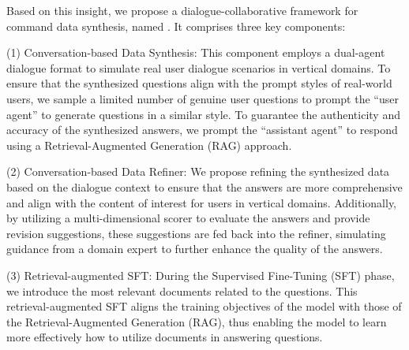 

Based on this insight, we propose a dialogue-collaborative framework for command data synthesis, named \ourmodel. It comprises three key components:

(1) Conversation-based Data Synthesis: This component employs a dual-agent dialogue format to simulate real user dialogue scenarios in vertical domains. To ensure that the synthesized questions align with the prompt styles of real-world users, we sample a limited number of genuine user questions to prompt the “user agent” to generate questions in a similar style. To guarantee the authenticity and accuracy of the synthesized answers, we prompt the “assistant agent” to respond using a Retrieval-Augmented Generation (RAG) approach.

(2) Conversation-based Data Refiner: We propose refining the synthesized data based on the dialogue context to ensure that the answers are more comprehensive and align with the content of interest for users in vertical domains. Additionally, by utilizing a multi-dimensional scorer to evaluate the answers and provide revision suggestions, these suggestions are fed back into the refiner, simulating guidance from a domain expert to further enhance the quality of the answers.

(3) Retrieval-augmented SFT: During the Supervised Fine-Tuning (SFT) phase, we introduce the most relevant documents related to the questions. This retrieval-augmented SFT aligns the training objectives of the model with those of the Retrieval-Augmented Generation (RAG), thus enabling the model to learn more effectively how to utilize documents in answering questions.


